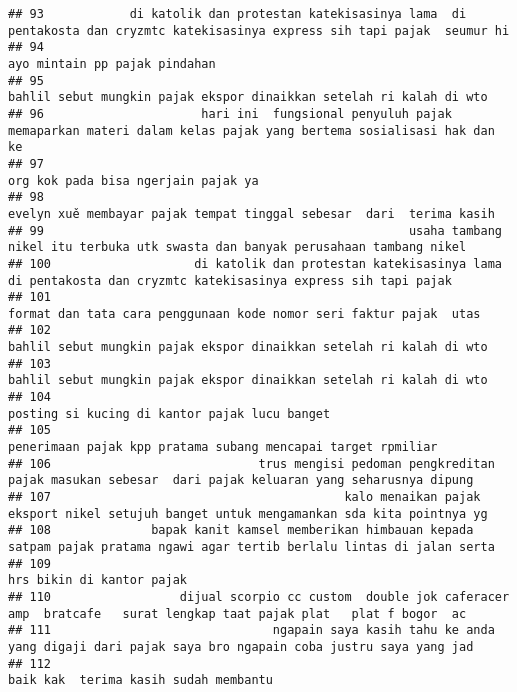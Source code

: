 \documentclass[
]{article}
\begin{document}
\begin{verbatim}
## 93            di katolik dan protestan katekisasinya lama  di pentakosta dan cryzmtc katekisasinya express sih tapi pajak  seumur hi
## 94                                                                                                     ayo mintain pp pajak pindahan
## 95                                                              bahlil sebut mungkin pajak ekspor dinaikkan setelah ri kalah di wto 
## 96                      hari ini  fungsional penyuluh pajak memaparkan materi dalam kelas pajak yang bertema sosialisasi hak dan ke 
## 97                                                                                              org kok pada bisa ngerjain pajak ya 
## 98                                                             evelyn xuě membayar pajak tempat tinggal sebesar  dari  terima kasih 
## 99                                                   usaha tambang nikel itu terbuka utk swasta dan banyak perusahaan tambang nikel 
## 100                    di katolik dan protestan katekisasinya lama  di pentakosta dan cryzmtc katekisasinya express sih tapi pajak  
## 101                                                              format dan tata cara penggunaan kode nomor seri faktur pajak  utas 
## 102                                                             bahlil sebut mungkin pajak ekspor dinaikkan setelah ri kalah di wto 
## 103                                                             bahlil sebut mungkin pajak ekspor dinaikkan setelah ri kalah di wto 
## 104                                                                                    posting si kucing di kantor pajak lucu banget
## 105                                                                    penerimaan pajak kpp pratama subang mencapai target rpmiliar 
## 106                             trus mengisi pedoman pengkreditan pajak masukan sebesar  dari pajak keluaran yang seharusnya dipung 
## 107                                         kalo menaikan pajak eksport nikel setujuh banget untuk mengamankan sda kita pointnya yg 
## 108              bapak kanit kamsel memberikan himbauan kepada satpam pajak pratama ngawi agar tertib berlalu lintas di jalan serta 
## 109                                                                                                        hrs bikin di kantor pajak
## 110                  dijual scorpio cc custom  double jok caferacer amp  bratcafe   surat lengkap taat pajak plat   plat f bogor  ac
## 111                               ngapain saya kasih tahu ke anda yang digaji dari pajak saya bro ngapain coba justru saya yang jad 
## 112                                                                                           baik kak  terima kasih sudah membantu 

\end{verbatim}
\end{document}
